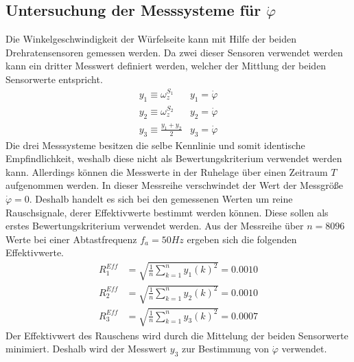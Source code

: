 \subsection{Untersuchung der Messsysteme für  $\dot{\varphi}$}
Die Winkelgeschwindigkeit der Würfelseite kann mit Hilfe der beiden Drehratensensoren gemessen werden. Da zwei dieser Sensoren verwendet werden kann ein dritter Messwert definiert werden, welcher der Mittlung der beiden Sensorwerte entspricht.
\begin{equation}
\begin{split}
y_1 \equiv \omega^{S_1}_z & y_1 = \dot{\varphi} \\
y_2 \equiv \omega^{S_2}_z & y_2 = \dot{\varphi} \\
y_3 \equiv \frac{y_1+y_2}{2} & y_3 = \dot{\varphi}
\end{split}
\end{equation}
Die drei Messsysteme besitzen die selbe Kennlinie und somit identische Empfindlichkeit, weshalb diese nicht als Bewertungskriterium verwendet werden kann. Allerdings können die Messwerte in der Ruhelage über einen Zeitraum $T$ aufgenommen werden. In dieser Messreihe verschwindet der Wert der Messgröße $\dot{\varphi}=0$. Deshalb handelt es sich bei den gemessenen Werten um reine Rauschsignale, derer Effektivwerte bestimmt werden können. Diese sollen als erstes Bewertungskriterium verwendet werden.
Aus der Messreihe über $n=8096$ Werte bei einer Abtastfrequenz $f_a=50Hz$ ergeben sich die folgenden Effektivwerte.
\begin{equation}
\begin{split}
R^{Eff}_1 &= \sqrt{\frac{1}{n}\sum^n_{k=1}{y_1(k)}^2} = 0.0010 \\
R^{Eff}_2 &= \sqrt{\frac{1}{n}\sum^n_{k=1}{y_2(k)}^2} = 0.0010 \\
R^{Eff}_3 &= \sqrt{\frac{1}{n}\sum^n_{k=1}{y_3(k)}^2} = 0.0007
\end{split}
\end{equation}
Der Effektivwert des Rauschens wird durch die Mittelung der beiden Sensorwerte minimiert. Deshalb wird der Messwert $y_3$ zur Bestimmung von $\dot{\varphi}$ verwendet.

